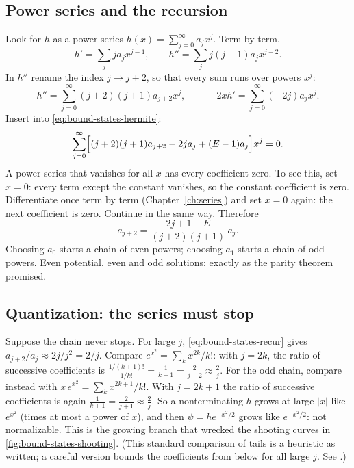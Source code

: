 \subsection{Power series and the recursion}

Look for $h$ as a power series $h(x)=\sum_{j=0}^{\infty}a_jx^j$. Term by term,
\[
h'=\sum_{j}ja_jx^{j-1},\qquad h''=\sum_{j}j(j-1)a_jx^{j-2}.
\]
In $h''$ rename the index $j\to j+2$, so that every sum runs over powers $x^j$:
\[
h''=\sum_{j=0}^{\infty}(j+2)(j+1)a_{j+2}x^{j},\qquad -2xh'=\sum_{j=0}^{\infty}(-2j)a_jx^j .
\]
Insert into \cref{eq:bound-states-hermite}:
\[
\sum_{j=0}^{\infty}\Bigl[(j+2)(j+1)a_{j+2}-2ja_j+(E-1)a_j\Bigr]x^j=0 .
\]
A power series that vanishes for all $x$ has every coefficient zero. To see this, set $x=0$: every term except the constant vanishes, so the constant coefficient is zero. Differentiate once term by term (Chapter~\ref{ch:series}) and set $x=0$ again: the next coefficient is zero. Continue in the same way. Therefore
\begin{equation}
a_{j+2}=\frac{2j+1-E}{(j+2)(j+1)}\,a_j .
\label{eq:bound-states-recur}
\end{equation}
Choosing $a_0$ starts a chain of even powers; choosing $a_1$ starts a chain of odd powers. Even potential, even and odd solutions: exactly as the parity theorem promised.

\subsection{Quantization: the series must stop}

Suppose the chain never stops. For large $j$, \cref{eq:bound-states-recur} gives $a_{j+2}/a_j\approx 2j/j^2=2/j$. Compare $e^{x^2}=\sum_{k}x^{2k}/k!$: with $j=2k$, the ratio of successive coefficients is $\frac{1/(k+1)!}{1/k!}=\frac{1}{k+1}=\frac{2}{j+2}\approx\frac{2}{j}$. For the odd chain, compare instead with $x\,e^{x^2}=\sum_k x^{2k+1}/k!$. With $j=2k+1$ the ratio of successive coefficients is again $\frac{1}{k+1}=\frac{2}{j+1}\approx\frac2j$. So a nonterminating $h$ grows at large $|x|$ like $e^{x^2}$ (times at most a power of $x$), and then $\psi=he^{-x^2/2}$ grows like $e^{+x^2/2}$: not normalizable. This is the growing branch that wrecked the shooting curves in \cref{fig:bound-states-shooting}. (This standard comparison of tails is a heuristic as written; a careful version bounds the coefficients from below for all large $j$. See \cite{griffiths}.)

